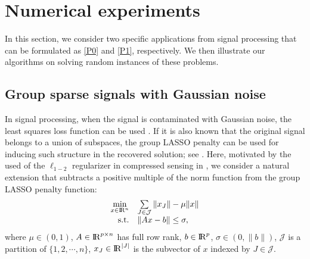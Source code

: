 \documentclass[10pt]{article}
\numberwithin{equation}{section}
\def\R{{\rm I\!R}}
\def\tx{{\widetilde x}}
\begin{document}
\section{Numerical experiments}\label{sec6}

In this section, we consider two specific applications from signal processing that can be formulated as \eqref{P0} and \eqref{P1}, respectively. We then illustrate our algorithms on solving random instances of these problems.%

\subsection{Group sparse signals with Gaussian noise}
In signal processing, when the signal is contaminated with Gaussian noise, the least squares loss function can be used \cite{CaRT06,ChDS01}. If it is also known that the original signal belongs to a union of subspaces, the group LASSO penalty \cite{YuLi06} can be used for inducing such structure in the recovered solution; see \cite{ElMi09}. Here, motivated by the used of the $\ell_{1-2}$ regularizer in compressed sensing in \cite{YiLH15}, we consider a natural extension that subtracts a positive multiple of the norm function from the group LASSO penalty function:
\begin{equation}\label{E1}
\begin{array}{rl}
\min\limits_{x\in\R^n} & \sum\limits_{J\in\mathcal{J}}\|x_J\| - \mu\|x\| \\
{\rm s.t.} & \|Ax - b\|\leq \sigma,
  \end{array}
\end{equation}
where $\mu \in (0,1)$, $A\in\R^{p\times n}$ has full row rank, $b\in\R^p$, $\sigma \in (0, \|b\|)$, $\mathcal{J}$ is a partition of $\{1,2,\cdots, n\}$, $x_J\in\R^{|J|}$ is the subvector of $x$ indexed by $J\in\mathcal{J}$. %
\end{document}

